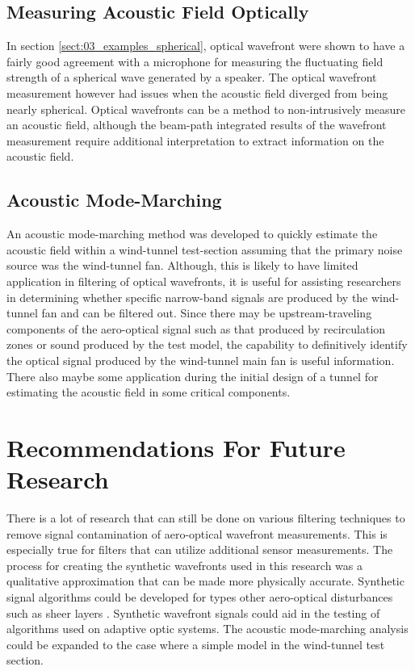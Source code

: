 \subsection{Measuring Acoustic Field Optically}
In section \ref{sect:03_examples_spherical}, optical wavefront were shown to have a fairly good agreement with a microphone for measuring the fluctuating field strength of a spherical wave generated by a speaker.
The optical wavefront measurement however had issues when the acoustic field diverged from being nearly spherical.
Optical wavefronts can be a method to non-intrusively measure an acoustic field, although the beam-path integrated results of the wavefront measurement require additional interpretation to extract information on the acoustic field.

\subsection{Acoustic Mode-Marching}
An acoustic mode-marching method was developed to quickly estimate the acoustic field within a wind-tunnel test-section assuming that the primary noise source was the wind-tunnel fan.
Although, this is likely to have limited application in filtering of optical wavefronts, it is useful for assisting researchers in determining whether specific narrow-band signals are produced by the wind-tunnel fan and can be filtered out.
Since there may be upstream-traveling components of the aero-optical signal such as that produced by recirculation zones or sound produced by the test model, the capability to definitively identify the optical signal produced by the wind-tunnel main fan is useful information.
There also maybe some application during the initial design of a tunnel for estimating the acoustic field in some critical components.

\section{Recommendations For Future Research}
There is a lot of research that can still be done on various filtering techniques to remove signal contamination of aero-optical wavefront measurements.
This is especially true for filters that can utilize additional sensor measurements.
The process for creating the synthetic wavefronts used in this research was a qualitative approximation that can be made more physically accurate.
Synthetic signal algorithms could be developed for types other aero-optical disturbances such as sheer layers \cite{Jumper-2017-8UnkaeqW}.
Synthetic wavefront signals could aid in the testing of algorithms used on adaptive optic systems.
The acoustic mode-marching analysis could be expanded to the case where a simple model in the wind-tunnel test section.
